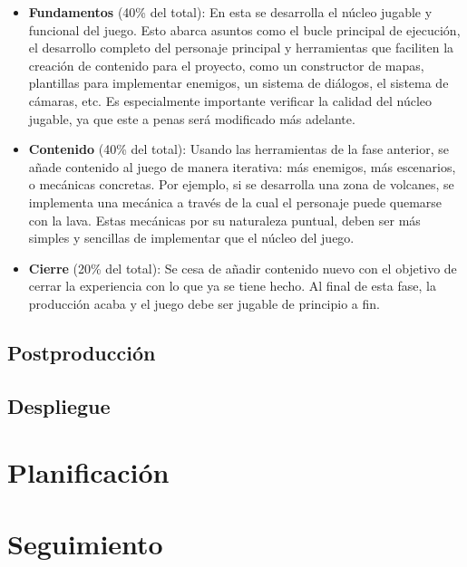 \begin{itemize}
    \item \textbf{Fundamentos} (40\% del total): En esta se desarrolla el núcleo jugable y funcional del juego. Esto abarca asuntos como el bucle principal de ejecución, el desarrollo completo del personaje principal y herramientas que faciliten la creación de contenido para el proyecto, como un constructor de mapas, plantillas para implementar enemigos, un sistema de diálogos, el sistema de cámaras, etc. Es especialmente importante verificar la calidad del núcleo jugable, ya que este a penas será modificado más adelante.
    \item \textbf{Contenido} (40\% del total): Usando las herramientas de la fase anterior, se añade contenido al juego de manera iterativa: más enemigos, más escenarios, o mecánicas concretas. Por ejemplo, si se desarrolla una zona de volcanes, se implementa una mecánica a través de la cual el personaje puede quemarse con la lava. Estas mecánicas por su naturaleza puntual, deben ser más simples y sencillas de implementar que el núcleo del juego.
    \item \textbf{Cierre} (20\% del total): Se cesa de añadir contenido nuevo con el objetivo de cerrar la experiencia con lo que ya se tiene hecho. Al final de esta fase, la producción acaba y el juego debe ser jugable de principio a fin.
\end{itemize}

\subsection{Postproducción}

\subsection{Despliegue}


\section{Planificación}

\section{Seguimiento}

